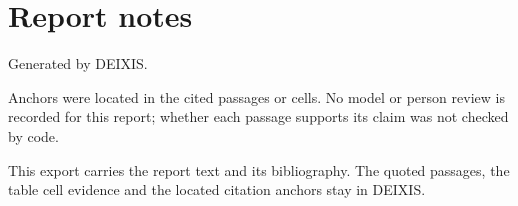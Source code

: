 \documentclass[journal]{IEEEtran}
\begin{document}
\section*{Report notes}

Generated by DEIXIS.

Anchors were located in the cited passages or cells. No model or person review is recorded for this report; whether each passage supports its claim was not checked by code.

This export carries the report text and its bibliography. The quoted passages, the table cell evidence and the located citation anchors stay in DEIXIS.




\end{document}
